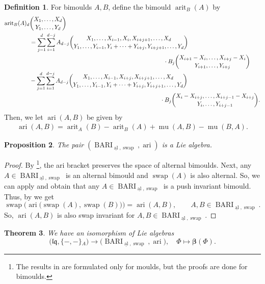 \documentclass[12pt,reqno]{amsart}
\newtheorem{thm}{Theorem}[section]
\newtheorem{prop}[thm]{Proposition}
\numberwithin{equation}{section}
\theoremstyle{definition}
\newtheorem{defi}[thm]{Definition}
\newcommand{\BARI}{\operatorname{BARI}_{\underline{\operatorname{al}},\operatorname{swap}}}
\newcommand{\bimap}{\boldsymbol{\beta}}
\newcommand{\lqq}{\mathfrak{lq}}
\newcommand{\ariemp}{\{-,-\}\!_A}
\begin{document}
\begin{defi} \label{def ari} For bimoulds $A,B$, define the bimould $\operatorname{arit}_B(A)$ by
\begin{align*}
\operatorname{arit}_B(A)_d&\binom{X_1,\ldots,X_d}{Y_1,\ldots,Y_d}\\
&=\sum_{j=1}^d\sum_{i=1}^{d-j} A_{d-j}\binom{X_1,\ldots,X_{i-1},X_i,X_{i+j+1},\ldots,X_d}{Y_1,\ldots,Y_{i-1},Y_i+\cdots+Y_{i+j},Y_{i+j+1},\ldots,Y_d} \\
&\hspace{8cm} \cdot B_j\binom{X_{i+1}-X_i,\ldots, X_{i+j}-X_i}{Y_{i+1},\ldots,Y_{i+j}} \\
&-\sum_{j=1}^d\sum_{i=1}^{d-j} A_{d-j}\binom{X_1,\ldots,X_{i-1},X_{i+j},X_{i+j+1},\ldots,X_d}{Y_1,\ldots,Y_{i-1},Y_i+\cdots+Y_{i+j},Y_{i+j+1},\ldots,Y_d} \\
&\hspace{7.8cm} \cdot B_j\binom{X_i-X_{i+j},\ldots, X_{i+j-1}-X_{i+j}}{Y_i,\ldots,Y_{i+j-1}}. 
\end{align*}
Then, we let $\operatorname{ari}(A,B)$ be given by
\begin{align} \label{eq:def_ari}
\operatorname{ari}(A,B)=\operatorname{arit}_A(B)-\operatorname{arit}_B(A)+\operatorname{mu}(A,B)-\operatorname{mu}(B,A).
\end{align}
\end{defi} 

\begin{prop} \label{prop:BARI_Liealg} \cite{Sc15} The pair $(\BARI,\operatorname{ari})$ is a Lie algebra.
\end{prop}

\begin{proof} By \cite[Proposition 2.5.2]{Sc15}\footnote{The results in \cite{Sc15} are formulated only for moulds, but the proofs are done for bimoulds.}, the ari bracket preserves the space of alternal bimoulds. Next, any $A\in\BARI$ is an alternal bimould and $\operatorname{swap}(A)$ is also alternal. So, we can apply \cite[Lemma 2.5.5]{Sc15} and obtain that any $A\in\BARI$ is a push invariant bimould. Thus, by \cite[Lemma 2.4.1]{Sc15} we get
\[\operatorname{swap}\big(\operatorname{ari}\big(\operatorname{swap}(A),\operatorname{swap}(B)\big)\big)=\operatorname{ari}(A,B), \qquad A,B\in\BARI.\]
So, $\operatorname{ari}(A,B)$ is also swap invariant for $A,B\in\BARI$.
\end{proof}

\begin{thm} \label{thm:lq_BARI_Lieiso} We have an isomorphism of Lie algebras
\[\big(\lqq,\ariemp\big)\to \big(\BARI,\operatorname{ari}\big),\quad \Phi\mapsto\bimap(\Phi).\]
\end{thm}
\end{document}
